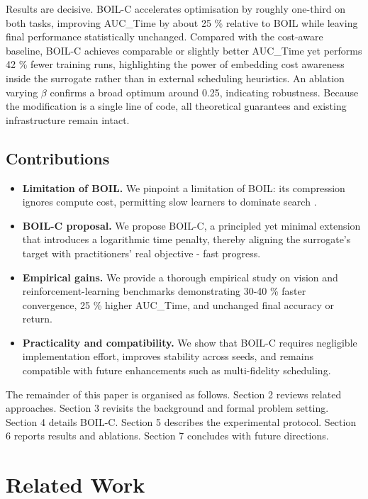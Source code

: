 \documentclass{article} %
\begin{document}
Results are decisive. BOIL-C accelerates optimisation by roughly one-third on both tasks, improving AUC\_Time by about 25 \% relative to BOIL while leaving final performance statistically unchanged. Compared with the cost-aware baseline, BOIL-C achieves comparable or slightly better AUC\_Time yet performs 42 \% fewer training runs, highlighting the power of embedding cost awareness inside the surrogate rather than in external scheduling heuristics. An ablation varying \(\beta\) confirms a broad optimum around 0.25, indicating robustness. Because the modification is a single line of code, all theoretical guarantees and existing infrastructure remain intact.

\subsection{Contributions}
\begin{itemize}
  \item \textbf{Limitation of BOIL.} We pinpoint a limitation of BOIL: its compression ignores compute cost, permitting slow learners to dominate search \cite{nguyen-2019-bayesian}.
  \item \textbf{BOIL-C proposal.} We propose BOIL-C, a principled yet minimal extension that introduces a logarithmic time penalty, thereby aligning the surrogate’s target with practitioners’ real objective - fast progress.
  \item \textbf{Empirical gains.} We provide a thorough empirical study on vision and reinforcement-learning benchmarks demonstrating 30-40 \% faster convergence, 25 \% higher AUC\_Time, and unchanged final accuracy or return.
  \item \textbf{Practicality and compatibility.} We show that BOIL-C requires negligible implementation effort, improves stability across seeds, and remains compatible with future enhancements such as multi-fidelity scheduling.
\end{itemize}

The remainder of this paper is organised as follows. Section 2 reviews related approaches. Section 3 revisits the background and formal problem setting. Section 4 details BOIL-C. Section 5 describes the experimental protocol. Section 6 reports results and ablations. Section 7 concludes with future directions.

\section{Related Work}
\label{sec:related}
\end{document}
